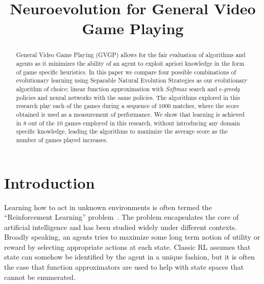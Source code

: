 \documentclass[conference]{IEEEtran}
\begin{document}
%
\title{Neuroevolution for General Video Game Playing}

\author{
}


\maketitle


\begin{abstract}
General Video Game Playing (GVGP) allows for the fair evaluation of algorithms and agents as it minimizes the ability of an agent to exploit apriori knowledge in the form of game specific heuristics. In this paper we compare four possible combinations of evolutionary learning using Separable Natural Evolution Strategies as our evolutionary algorithm of choice; linear function approximation with \textit{Softmax} search and $\epsilon$-\textit{greedy} policies and neural networks with the same policies. The algorithms explored in this research play each of the games during a sequence of $1000$ matches, where the score obtained is used as a measurement of performance. We show that learning is achieved in $8$ out of the $10$ games employed in this research, without introducing any domain specific knowledge, leading the algorithms to maximize the average score as the number of games played increases.

\end{abstract}

\IEEEpeerreviewmaketitle

\section{Introduction} \label{sec:intro}

Learning how to act in unknown environments is often termed the ``Reinforcement Learning'' problem~\cite{sutton1998introduction}. The problem encapsulates the core of artificial intelligence and has been studied widely under different contexts. Broadly speaking, an agents tries to maximize some long term notion of utility or reward by selecting appropriate actions at each state. Classic RL assumes that state can somehow be identified by the agent in a unique fashion, but it is often the case that function approximators are used to help with state spaces that cannot be enumerated. 
\end{document}

